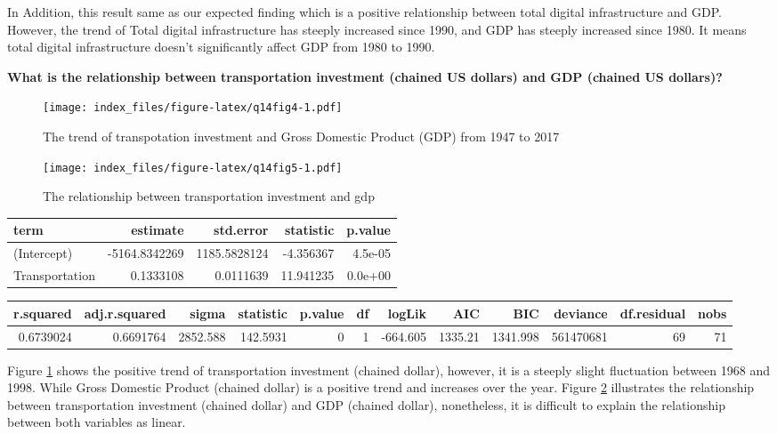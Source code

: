 \documentclass[
]{article}
\begin{document}
In Addition, this result same as our expected finding which is a positive relationship between total digital infrastructure and GDP. However, the trend of Total digital infrastructure has steeply increased since 1990, and GDP has steeply increased since 1980. It means total digital infrastructure doesn't significantly affect GDP from 1980 to 1990.

\textbf{What is the relationship between transportation investment (chained US dollars) and GDP (chained US dollars)?}

\begin{figure}
\centering
\texttt{[image: index\_files/figure-latex/q14fig4-1.pdf]}
\caption{\label{fig:q14fig4}The trend of transpotation investment and Gross Domestic Product (GDP) from 1947 to 2017}
\end{figure}

\begin{figure}
\centering
\texttt{[image: index\_files/figure-latex/q14fig5-1.pdf]}
\caption{\label{fig:q14fig5}The relationship between transportation investment and gdp}
\end{figure}

\begin{table}
\centering
\begin{tabular}{l|r|r|r|r}
\hline
term & estimate & std.error & statistic & p.value\\
\hline
(Intercept) & -5164.8342269 & 1185.5828124 & -4.356367 & 4.5e-05\\
\hline
Transportation & 0.1333108 & 0.0111639 & 11.941235 & 0.0e+00\\
\hline
\end{tabular}
\end{table}

\begin{table}
\centering
\begin{tabular}{r|r|r|r|r|r|r|r|r|r|r|r}
\hline
r.squared & adj.r.squared & sigma & statistic & p.value & df & logLik & AIC & BIC & deviance & df.residual & nobs\\
\hline
0.6739024 & 0.6691764 & 2852.588 & 142.5931 & 0 & 1 & -664.605 & 1335.21 & 1341.998 & 561470681 & 69 & 71\\
\hline
\end{tabular}
\end{table}

Figure \ref{fig:q14fig4} shows the positive trend of transportation investment (chained dollar), however, it is a steeply slight fluctuation between 1968 and 1998. While Gross Domestic Product (chained dollar) is a positive trend and increases over the year. Figure \ref{fig:q14fig5} illustrates the relationship between transportation investment (chained dollar) and GDP (chained dollar), nonetheless, it is difficult to explain the relationship between both variables as linear.
\end{document}
